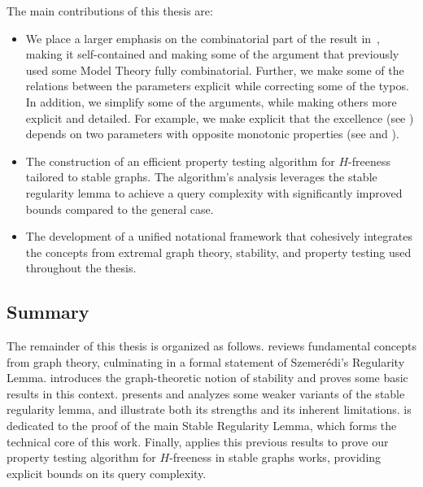         The main contributions of this thesis are:
        \begin{itemize}
            \item We place a larger emphasis on the combinatorial part of the result
                in~\cite{regularity_lemmas_for_stable_graphs}, making it self-contained and making some of the argument that
                previously used some Model Theory fully combinatorial.
                Further, we make some of the relations between the parameters explicit while correcting some of the typos.
                In addition, we simplify some of the arguments, while making others more explicit and detailed.
                For example, we make explicit that the excellence (see ) depends on two parameters
                with opposite monotonic properties (see  and ).
            \item The construction of an efficient property testing algorithm for $H$-freeness tailored to stable graphs.
                The algorithm's analysis leverages the stable regularity lemma to achieve a query complexity with significantly
                improved bounds compared to the general case.
            \item The development of a unified notational framework that cohesively integrates the concepts from
                extremal graph theory, stability, and property testing used throughout the thesis.
        \end{itemize}

    \subsection{Summary} \label{subsec:summary}

        The remainder of this thesis is organized as follows.
         reviews fundamental concepts from graph theory, culminating in a formal statement of Szemer\'edi's
        Regularity Lemma.
         introduces the graph-theoretic notion of stability and proves some basic results in this context.
         presents and analyzes some weaker variants of the stable regularity lemma, and illustrate both its
        strengths and its inherent limitations.
         is dedicated to the proof of the main Stable Regularity Lemma, which forms the technical core of this
        work.
        Finally,  applies this previous results to prove our property testing algorithm for
        $H$-freeness in stable graphs works, providing explicit bounds on its query complexity.
